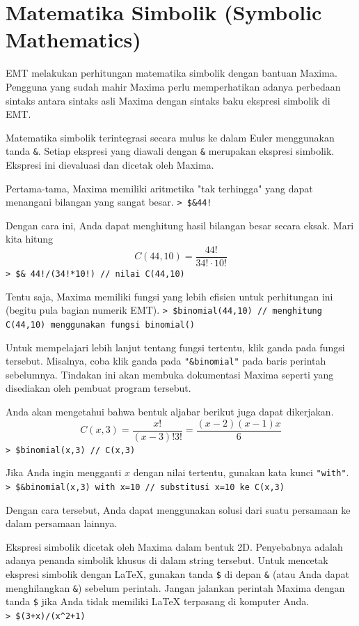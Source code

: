 \documentclass[11pt, a4paper]{article}
\newcommand{\emtcmd}[1]{\noindent\texttt{\textcolor{emtcommand}{>}\ #1}\par\smallskip}
\begin{document}
\section*{Matematika Simbolik (Symbolic Mathematics)}

EMT melakukan perhitungan matematika simbolik dengan bantuan Maxima. Pengguna yang sudah mahir Maxima perlu memperhatikan adanya perbedaan sintaks antara sintaks asli Maxima dengan sintaks baku ekspresi simbolik di EMT.

Matematika simbolik terintegrasi secara mulus ke dalam Euler menggunakan tanda \texttt{\&}. Setiap ekspresi yang diawali dengan \texttt{\&} merupakan ekspresi simbolik. Ekspresi ini dievaluasi dan dicetak oleh Maxima.

Pertama-tama, Maxima memiliki aritmetika "tak terhingga" yang dapat menangani bilangan yang sangat besar.
\emtcmd{\$\&44!}

Dengan cara ini, Anda dapat menghitung hasil bilangan besar secara eksak. Mari kita hitung
$$C(44,10) = \frac{44!}{34! \cdot 10!}$$
\emtcmd{\$\& 44!/(34!*10!) \textcolor{emtcomment}{// nilai C(44,10)}}

Tentu saja, Maxima memiliki fungsi yang lebih efisien untuk perhitungan ini (begitu pula bagian numerik EMT).
\emtcmd{\$binomial(44,10) \textcolor{emtcomment}{// menghitung C(44,10) menggunakan fungsi binomial()}}

Untuk mempelajari lebih lanjut tentang fungsi tertentu, klik ganda pada fungsi tersebut. Misalnya, coba klik ganda pada \texttt{"\&binomial"} pada baris perintah sebelumnya. Tindakan ini akan membuka dokumentasi Maxima seperti yang disediakan oleh pembuat program tersebut.

Anda akan mengetahui bahwa bentuk aljabar berikut juga dapat dikerjakan.
$$C(x,3)=\frac{x!}{(x-3)!3!}=\frac{(x-2)(x-1)x}{6}$$
\emtcmd{\$binomial(x,3) \textcolor{emtcomment}{// C(x,3)}}

Jika Anda ingin mengganti $x$ dengan nilai tertentu, gunakan kata kunci \texttt{"with"}.
\emtcmd{\$\&binomial(x,3) with x=10 \textcolor{emtcomment}{// substitusi x=10 ke C(x,3)}}

Dengan cara tersebut, Anda dapat menggunakan solusi dari suatu persamaan ke dalam persamaan lainnya.

Ekspresi simbolik dicetak oleh Maxima dalam bentuk 2D. Penyebabnya adalah adanya penanda simbolik khusus di dalam string tersebut. Untuk mencetak ekspresi simbolik dengan LaTeX, gunakan tanda \texttt{\$} di depan \texttt{\&} (atau Anda dapat menghilangkan \texttt{\&}) sebelum perintah. Jangan jalankan perintah Maxima dengan tanda \texttt{\$} jika Anda tidak memiliki LaTeX terpasang di komputer Anda.
\emtcmd{\$(3+x)/(x\^{}2+1)}
\end{document}
